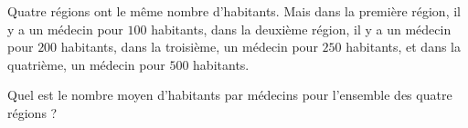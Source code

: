 
\begin{exercice}\label{exosmath-0315}


Quatre régions ont le même nombre d'habitants. Mais dans la première région, il y a un médecin pour \( 100\) habitants, dans la deuxième région, il y a un médecin pour \( 200\) habitants, dans la troisième, un médecin pour \( 250\) habitants, et dans la quatrième, un médecin pour \( 500\) habitants.

Quel est le nombre moyen d'habitants par médecins pour l'ensemble des quatre régions ?

\end{exercice}

